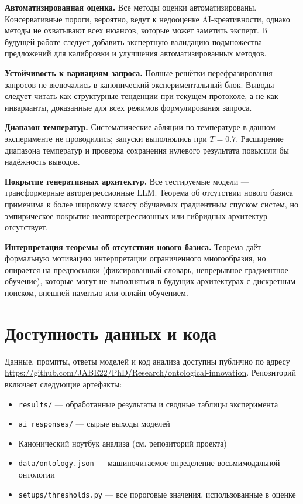 \documentclass[sn-mathphys-num]{sn-jnl}
\begin{document}
\textbf{Автоматизированная оценка.} Все методы оценки автоматизированы. Консервативные пороги, вероятно, ведут к недооценке AI-креативности, однако методы не охватывают всех нюансов, которые может заметить эксперт. В будущей работе следует добавить экспертную валидацию подмножества предложений для калибровки и улучшения автоматизированных методов.

\textbf{Устойчивость к вариациям запроса.} Полные решётки перефразирования запросов не включались в канонический экспериментальный блок. Выводы следует читать как структурные тенденции при текущем протоколе, а не как инварианты, доказанные для всех режимов формулирования запроса.

\textbf{Диапазон температур.} Систематические абляции по температуре в данном эксперименте не проводились; запуски выполнялись при $T=0.7$. Расширение диапазона температур и проверка сохранения нулевого результата повысили бы надёжность выводов.

\textbf{Покрытие генеративных архитектур.} Все тестируемые модели --- трансформерные авторегрессионные LLM. Теорема об отсутствии нового базиса применима к более широкому классу обучаемых градиентным спуском систем, но эмпирическое покрытие неавторегрессионных или гибридных архитектур отсутствует.

\textbf{Интерпретация теоремы об отсутствии нового базиса.} Теорема даёт формальную мотивацию интерпретации ограниченного многообразия, но опирается на предпосылки (фиксированный словарь, непрерывное градиентное обучение), которые могут не выполняться в будущих архитектурах с дискретным поиском, внешней памятью или онлайн-обучением.

\section{Доступность данных и кода}
\label{sec:data}

Данные, промпты, ответы моделей и код анализа доступны публично по адресу
\url{https://github.com/JABE22/PhD/Research/ontological-innovation}.
Репозиторий включает следующие артефакты:
\begin{itemize}
  \item \texttt{results/} --- обработанные результаты и сводные таблицы эксперимента
  \item \texttt{ai\_responses/} --- сырые выходы моделей
  \item Канонический ноутбук анализа (см. репозиторий проекта)
  \item \texttt{data/ontology.json} --- машиночитаемое определение восьмимодальной онтологии
  \item \texttt{setups/thresholds.py} --- все пороговые значения, использованные в оценке
\end{itemize}
\end{document}
